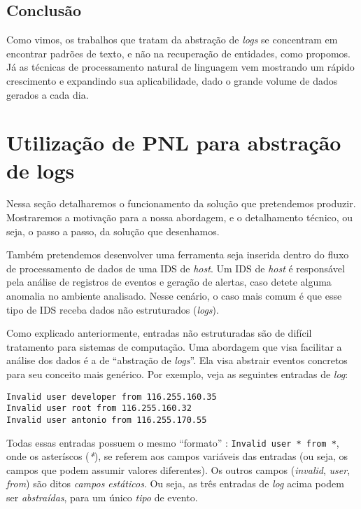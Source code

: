 \documentclass[
	12pt,				%
	openright,			%
	twoside,			%
	a4paper,			%
	english,			%
	spanish,			%
	brazil,				%
	]{abntex2}
\begin{document}

\section{Conclusão}
Como vimos, os trabalhos que tratam da abstração de \emph{logs} se concentram em encontrar padrões de texto, e não na recuperação de entidades, como propomos. Já as técnicas de processamento natural de linguagem vem mostrando um rápido crescimento e expandindo sua aplicabilidade, dado o grande volume de dados gerados a cada dia.

\chapter{Utilização de PNL para abstração de logs}\label{chap:proposta}

Nessa seção detalharemos o funcionamento da solução que pretendemos produzir. Mostraremos a motivação para a nossa abordagem, e o detalhamento técnico, ou seja, o passo a passo, da solução que desenhamos.

Também pretendemos desenvolver uma ferramenta seja inserida dentro do fluxo de processamento de dados de uma IDS de \emph{host}. Um IDS de \emph{host} é responsável pela análise de registros de eventos e geração de alertas, caso detete alguma anomalia no ambiente analisado. Nesse cenário, o caso mais comum é que esse tipo de IDS receba dados não estruturados (\emph{logs}). 

Como explicado anteriormente, entradas não estruturadas são de difícil tratamento para sistemas de computação. Uma abordagem que visa facilitar a análise dos dados é a de ``abstração de \emph{logs}''. Ela visa abstrair eventos concretos para seu conceito mais genérico. Por exemplo, veja as seguintes entradas de \emph{log}:

\begin{verbatim}
Invalid user developer from 116.255.160.35
Invalid user root from 116.255.160.32
Invalid user antonio from 116.255.170.55
\end{verbatim}

Todas essas entradas possuem o mesmo ``formato'' : \verb|Invalid user * from *|, onde os asteríscos (\emph{*}), se referem aos campos variáveis das entradas (ou seja, os campos que podem assumir valores diferentes). Os outros campos (\emph{invalid}, \emph{user}, \emph{from}) são ditos \emph{campos estáticos}. Ou seja, as três entradas de \emph{log} acima podem ser \emph{abstraídas}, para um único \emph{tipo} de evento.
\end{document}
